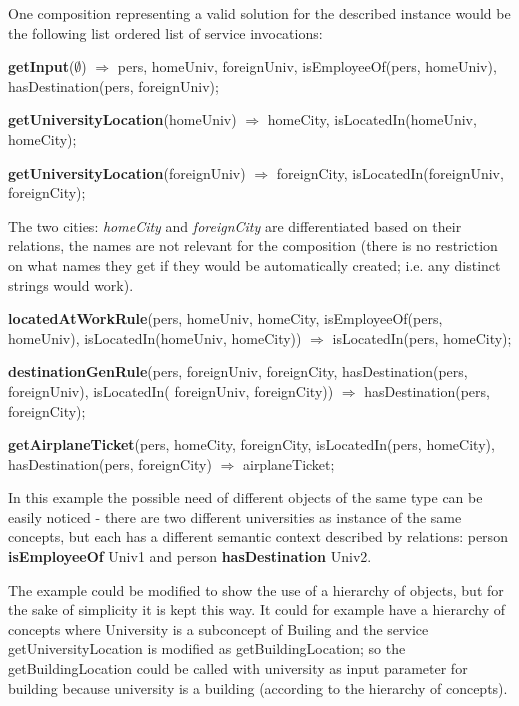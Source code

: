 \documentclass[12pt]{article}
\theoremstyle{definition}
\begin{document}
One composition representing a valid solution for the described instance would be the following list ordered list of service invocations:

\noindent \textbf{getInput}\big($\emptyset$\big) $\Longrightarrow$ pers, homeUniv, foreignUniv, isEmployeeOf(pers, homeUniv), hasDestination(pers, foreignUniv);

\noindent \textbf{getUniversityLocation}\big(homeUniv\big) $\Longrightarrow$ homeCity, isLocatedIn(homeUniv, homeCity); 

\noindent \textbf{getUniversityLocation}\big(foreignUniv\big) $\Longrightarrow$ foreignCity, isLocatedIn(foreignUniv, foreignCity);

The two cities: \emph{homeCity} and \emph{foreignCity} are differentiated based on their relations, the names are not relevant for the composition (there is no restriction on what names they get if they would be automatically created; i.e. any distinct strings would work).

\noindent \textbf{locatedAtWorkRule}\big(pers, homeUniv, homeCity, isEmployeeOf(pers, homeUniv), isLocatedIn(homeUniv, homeCity)\big) $\Longrightarrow$ isLocatedIn(pers, homeCity);

\noindent \textbf{destinationGenRule}\big(pers, foreignUniv, foreignCity, hasDestination(pers, foreignUniv), isLocatedIn( foreignUniv, foreignCity)\big) $\Longrightarrow$ hasDestination(pers, foreignCity); 

\noindent \textbf{getAirplaneTicket}\big(pers, homeCity, foreignCity, isLocatedIn(pers, homeCity), hasDestination(pers, foreignCity) $\Longrightarrow$ airplaneTicket;

In this example the possible need of different objects of the same type can be easily noticed - there are two different universities as instance of the same concepts, but each has a different semantic context described by relations: person \textbf{isEmployeeOf} Univ1 and person \textbf{hasDestination} Univ2.

The example could be modified to show the use of a hierarchy of objects, but for the sake of simplicity it is kept this way. It could for example have a hierarchy of concepts where University is a subconcept of Builing and the service getUniversityLocation is modified as getBuildingLocation; so the getBuildingLocation could be called with university as input parameter for building because university is a building (according to the hierarchy of concepts).

\newpage
\end{document}
